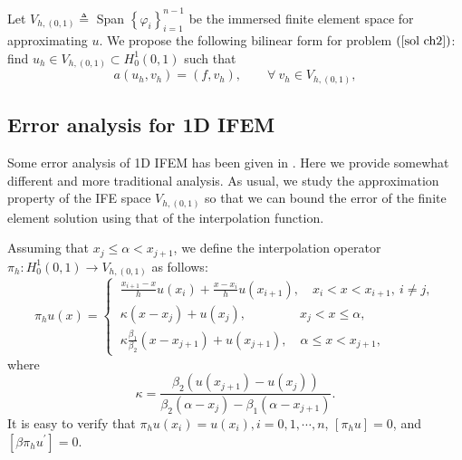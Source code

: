 \documentclass[11pt]{article}
\numberwithin{equation}{section}
\begin{document}
Let $V_{h, \left(0, 1\right)}\triangleq$ Span $\left\{\varphi_{i}\right\}^{n-1}_{i=1}$
be the immersed finite element space for approximating $u$.
We propose the following bilinear form for problem
$\left(\ref{sol ch2}\right)$:
find $u_{h} \in V_{h, \left(0, 1\right)} \subset H^{1}_{0}\left(0,1\right)$ such that
\begin{equation}\label{c ch2}
a\left(u_{h},v_{h}\right)=\left(f,v_{h}\right),\qquad\forall~ v_{h} \in V_{h, \left(0, 1\right)},
\end{equation}



\subsection{Error analysis for 1D IFEM}

Some error analysis of 1D IFEM has been given in  \cite{li1998immersed, li2006immersed}.
Here we provide somewhat different and more traditional analysis.
As usual, we study the approximation property of the IFE space $V_{h, \left(0, 1\right)}$
so that we can bound the error of the finite element solution using that of the interpolation function.

Assuming that $x_{j}\leq \alpha <x_{j+1}$,
we define the interpolation operator $\pi_{h}: H^{1}_{0}\left(0,1\right)\longrightarrow V_{h, \left(0, 1\right)}$ as follows:
\begin{equation}\label{int ch2}
\pi_{h} u\left(x\right)=
\begin{cases}
 ~\frac{x_{i+1}-x}{h}u\left(x_{i}\right)+\frac{x-x_{i}}{h}u\left(x_{i+1}\right),  \quad x_{i}< x < x_{i+1},~i\neq j,\\
 ~\kappa\left(x-x_{j}\right)+u\left(x_{j}\right),\qquad\qquad ~x_{j}< x\leq \alpha,\\
 ~\kappa \frac{\beta_{1}}{\beta_{2}}\left(x-x_{j+1}\right)+u\left(x_{j+1}\right),  \quad \alpha\leq x <x_{j+1},
 \end{cases}
\end{equation}
where
\begin{equation*}\label{}
\kappa=\frac{\beta_{2}\left(u\left(x_{j+1}\right)-u\left(x_{j}\right)\right)}{\beta_{2}
\left(\alpha-x_{j}\right)-\beta_{1}\left(\alpha-x_{j+1}\right)}.
\end{equation*}
It is easy to verify that $\pi_{h} u\left(x_{i}\right)=u\left(x_{i}\right), i=0, 1,\cdots, n$, $\left[\pi_{h} u\right]=0$, and $\left[\beta\pi_{h} u^{'}\right]=0$.
\end{document}
